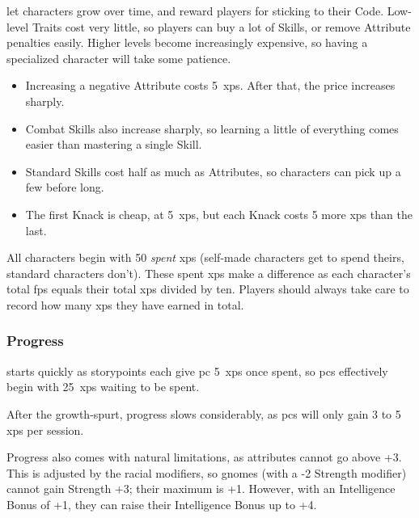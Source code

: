 \begin{multicols}{2}


\noindent
{} let characters grow over time, and reward players for sticking to their Code.
Low-level Traits cost very little, so players can buy a lot of Skills, or remove Attribute penalties easily.
Higher levels become increasingly expensive, so having a specialized character will take some patience.

\begin{itemize}
  \item
  Increasing a negative Attribute costs 5~\glspl{xp}.
  After that, the price increases sharply.
  \item
  Combat Skills also increase sharply, so learning a little of everything comes easier than mastering a single Skill.
  \item
  Standard Skills cost half as much as Attributes, so characters can pick up a few before long.
  \item
  The first Knack is cheap, at 5~\glspl{xp}, but each Knack costs 5 more \glspl{xp} than the last.
\end{itemize}

All characters begin with 50 \textit{spent} \glspl{xp}
(self-made characters get to spend theirs, standard characters don't).
These spent \glspl{xp} make a difference as each character's total \glspl{fp} equals their total \glspl{xp} divided by ten.
Players should always take care to record how many \glspl{xp} they have earned in total.

\subsubsection{Progress}
starts quickly as \glspl{storypoint} each give \gls{pc} 5~\glspl{xp} once spent, so \glspl{pc} effectively begin with 25~\glspl{xp} waiting to be spent.

After the growth-spurt, progress slows considerably, as \glspl{pc} will only gain 3 to 5 \glspl{xp} per session.


\label{racial_limits}

Progress also comes with natural limitations, as \glspl{attribute} cannot go above +3.
This is adjusted by the racial modifiers, so gnomes (with a -2 Strength modifier) cannot gain Strength +3; their maximum is +1.
However, with an Intelligence Bonus of +1, they can raise their Intelligence Bonus up to +4.


\end{multicols}
